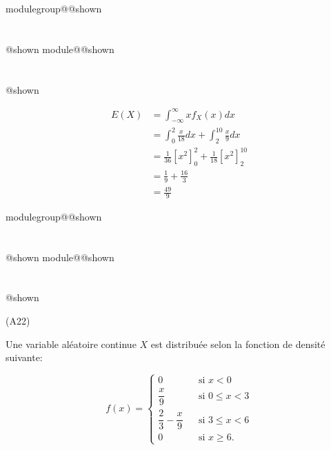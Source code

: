 \documentclass{Evaluation}
\makeatletter
\newcommand{\currentmodulekey}{}
\newcommand{\currentmoduletitle}{}
\newcommand{\currentgroupkey}{}
\newcommand{\currentgrouptitle}{}
\newcommand{\showmoduleifneeded}{%
  \ifx\currentgroupkey\empty\else
    \expandafter\ifx\csname modulegroup@\currentgroupkey @shown\endcsname\relax
      \section*{\currentgrouptitle}%
      \expandafter\gdef\csname modulegroup@\currentgroupkey @shown\endcsname{1}%
    \fi
  \fi
  \expandafter\ifx\csname module@\currentmodulekey @shown\endcsname\relax
    \section*{\currentmoduletitle}%
    \expandafter\gdef\csname module@\currentmodulekey @shown\endcsname{1}%
  \fi
}
\newenvironment{A22}{\showmoduleifneeded}{}
\newenvironment{H26}{\showmoduleifneeded}{}
\makeatother
\begin{document}
\begin{questions}
\begin{H26}
\begin{parts}
\begin{solution}
\begin{align*}
    E(X)&=\int_{-\infty}^{\infty}xf_X(x)dx\\
    &= \int_0^2\frac{x}{18}dx+\int_2^{10}\frac{x}{9}dx\\
    &=\frac{1}{36}[x^2]_{0}^2+ \frac{1}{18}[x^2]_2^{10}\\
    &= \frac{1}{9}+\frac{16}{3}\\
    &=\frac{49}{9}
\end{align*}    
\end{solution}
\end{parts}
\end{H26}



\begin{A22}
\question
(A22) 

Une variable aléatoire continue $X$ est distribuée selon la fonction de densité suivante:

$$f(x) = \left \{
\begin{array}{lcl}
    0               & &\text{si } x < 0 \\[0.5em]
    \dfrac{x}{9}              & &\text{si } 0 \leq x < 3   \\[1em]
    \dfrac{2}{3}-\dfrac{x}{9} & &\text{si } 3 \leq x < 6 \\[1em]
    0               & &\text{si } x \geq 6.
\end{array}
\right.$$

\end{A22}
\end{questions}
\end{document}
